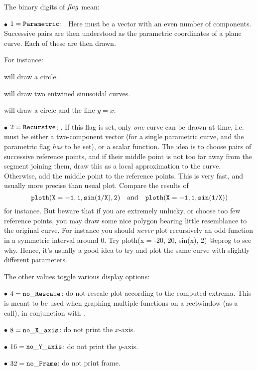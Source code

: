 \noindent The binary digits of $\hbox{\it f\kern0pt lag\/}$ mean:

$\bullet$ $1 = {\tt Parametric}$: . Here  must
be a vector with an even number of components. Successive pairs are then
understood as the parametric coordinates of a plane curve. Each of these are
then drawn.

For instance:

 will draw a circle.

 will draw two entwined sinusoidal
curves.

 will draw a circle and the line
$y=x$.


$\bullet$ $2 = {\tt Recursive}$: . If this flag is set,
only \emph{one} curve can be drawn at time, i.e.~ must be either a
two-component vector (for a single parametric curve, and the parametric flag
\emph{has} to be set), or a scalar function. The idea is to choose pairs of
successive reference points, and if their middle point is not too far away
from the segment joining them, draw this as a local approximation to the
curve. Otherwise, add the middle point to the reference points. This is very
fast, and usually more precise than usual plot. Compare the results of
$${\tt ploth(X=-1,1,sin(1/X),2)}\quad
 {\rm and}\quad{\tt ploth(X=-1,1,sin(1/X))}$$
for instance. But beware that if you are extremely unlucky, or choose too few
reference points, you may draw some nice polygon bearing little resemblance
to the original curve. For instance you should \emph{never} plot recursively
an odd function in a symmetric interval around 0. Try
\bprog
  ploth(x = -20, 20, sin(x), 2)
@eprog
\noindent to see why. Hence, it's usually a good idea to try and plot the same
curve with slightly different parameters.

The other values toggle various display options:

$\bullet$ $4 = {\tt no\_Rescale}$: do not rescale plot according to the
computed extrema. This is meant to be used when graphing multiple functions
on a rectwindow (as a  call), in conjunction with
.

$\bullet$ $8 = {\tt no\_X\_axis}$: do not print the $x$-axis.

$\bullet$ $16 = {\tt no\_Y\_axis}$: do not print the $y$-axis.

$\bullet$ $32 = {\tt no\_Frame}$: do not print frame.

